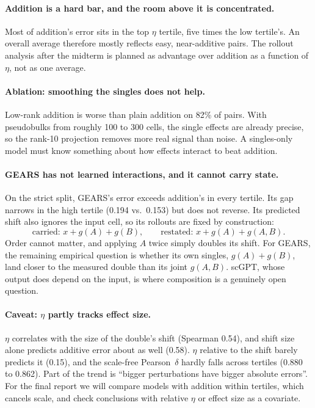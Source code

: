\documentclass[11pt]{article}
\newcommand{\pd}{Pearson~$\delta$}
\begin{document}
\paragraph{Addition is a hard bar, and the room above it is concentrated.} Most of
addition's error sits in the top $\eta$ tertile, five times the low tertile's. An overall
average therefore mostly reflects easy, near-additive pairs. The rollout analysis after the
midterm is planned as advantage over addition as a function of $\eta$, not as one average.

\paragraph{Ablation: smoothing the singles does not help.} Low-rank addition is worse than plain
addition on 82\% of pairs. With pseudobulks from roughly 100 to 300 cells, the single
effects are already precise, so the rank-10 projection removes more real signal than noise.
A singles-only model must know something about how effects interact to beat addition.

\paragraph{GEARS has not learned interactions, and it cannot carry state.} On the strict
split, GEARS's error exceeds addition's in every tertile. Its gap narrows in the high
tertile (0.194 vs.\ 0.153) but does not reverse. Its predicted shift also ignores the input
cell, so its rollouts are fixed by construction:
\begin{equation}
\text{carried: } x + g(A) + g(B), \qquad \text{restated: } x + g(A) + g(A,B).
\end{equation}
Order cannot matter, and applying $A$ twice simply doubles its shift. For GEARS, the
remaining empirical question is whether its own singles, $g(A) + g(B)$, land closer to the
measured double than its joint $g(A,B)$. scGPT, whose output does depend on the input, is
where composition is a genuinely open question.

\paragraph{Caveat: $\eta$ partly tracks effect size.} $\eta$ correlates with the size of the
double's shift (Spearman 0.54), and shift size alone predicts additive error about as well
(0.58). $\eta$ relative to the shift barely predicts it (0.15), and the scale-free \pd{}
hardly falls across tertiles (0.880 to 0.862). Part of the trend is ``bigger perturbations
have bigger absolute errors''. For the final report we will compare models with addition
within tertiles, which cancels scale, and check conclusions with relative $\eta$ or effect
size as a covariate.
\end{document}
